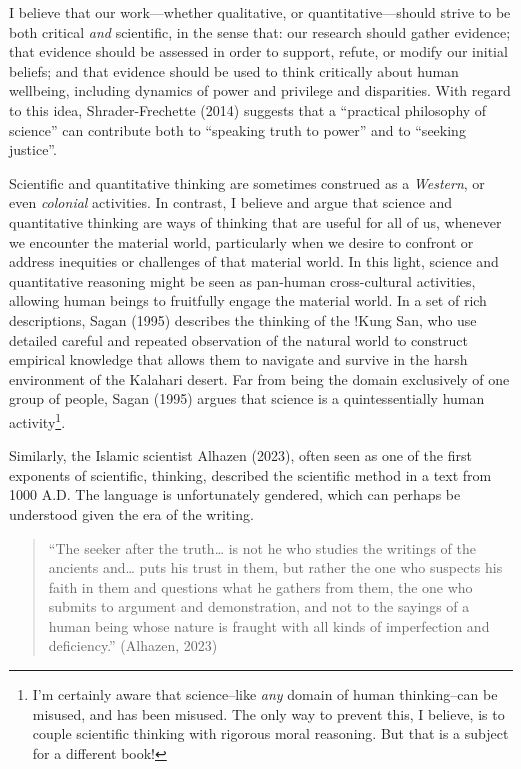 \documentclass[
  letterpaper,
  DIV=11,
  numbers=noendperiod]{scrreprt}
\begin{document}
I believe that our work---whether qualitative, or quantitative---should
strive to be both critical \emph{and} scientific, in the sense that: our
research should gather evidence; that evidence should be assessed in
order to support, refute, or modify our initial beliefs; and that
evidence should be used to think critically about human wellbeing,
including dynamics of power and privilege and disparities. With regard
to this idea, Shrader-Frechette (2014) suggests that a ``practical
philosophy of science'' can contribute both to ``speaking truth to
power'' and to ``seeking justice''.

Scientific and quantitative thinking are sometimes construed as a
\emph{Western}, or even \emph{colonial} activities.
 In contrast, I believe and argue that
science and quantitative thinking are ways of thinking that are useful
for all of us, whenever we encounter the material world, particularly
when we desire to confront or address inequities or challenges of that
material world. In this light, science and quantitative reasoning might
be seen as pan-human cross-cultural activities, allowing human beings to
fruitfully engage the material world. In a set of rich descriptions,
Sagan (1995) describes the thinking of the !Kung San,
 who use detailed careful and repeated observation of
the natural world to construct empirical knowledge that allows them to
navigate and survive in the harsh environment of the Kalahari desert.
Far from being the domain exclusively of one group of people, Sagan
(1995) argues that science is a quintessentially human
activity\footnote{I'm certainly aware that science--like \emph{any}
  domain of human thinking--can be misused, and has been misused. The
  only way to prevent this, I believe, is to couple scientific thinking
  with rigorous moral reasoning. But that is a subject for a different
  book!}.

Similarly, the Islamic scientist Alhazen (2023), often seen as one of
the first exponents of scientific, thinking, described the scientific
method in a text from 1000 A.D. The language is unfortunately gendered,
which can perhaps be understood given the era of the writing.

\begin{quote}
``The seeker after the truth\ldots{} is not he who studies the writings
of the ancients and\ldots{} puts his trust in them, but rather the one
who suspects his faith in them and questions what he gathers from them,
the one who submits to argument and demonstration, and not to the
sayings of a human being whose nature is fraught with all kinds of
imperfection and deficiency.'' (Alhazen, 2023)
\end{quote}
\end{document}
